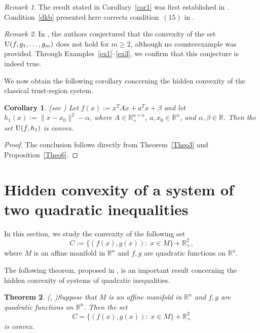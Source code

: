 \documentclass[]{interact}
\theoremstyle{plain}%
\newtheorem{theorem}{Theorem}[section]
\newtheorem{corollary}[theorem]{Corollary}
\theoremstyle{definition}
\theoremstyle{remark}
\newtheorem{remark}{Remark}
\begin{document}
	\begin{remark}
		The result stated in Corollary~\ref{cor1} was first established in
		\cite[Theorem~5.1 and Lemma~5.1]{BomzeJeyakumarLi2018}. Condition~\eqref{dkb} presented here corrects condition~$(15)$ in \cite[Theorem~5.1]{BomzeJeyakumarLi2018}.
	\end{remark}
	
	\begin{remark}
		In \cite[Example~3]{LaraUrruty2022}, the authors conjectured that the convexity of the set ${\rm U}(f,g_1,\ldots,g_m)$ does not hold for $m\geq 2$, although no counterexample was provided. Through Examples~\ref{ex1}--\ref{ex3}, we confirm that this conjecture is indeed true.
	\end{remark}
	
	We now obtain the following corollary concerning the hidden convexity of the classical trust-region system.
	
	\begin{corollary}{\rm (see \cite[Theorem~2.2]{Polyak1998})}
		Let $f(x):=x^TAx+a^Tx+\beta$ and let $h_1(x):=\|x-x_0\|^2-\alpha$, where
		$A\in \mathbb{R}^{n\times n}_{+}$, $a,x_0\in \mathbb{R}^n$, and
		$\alpha,\beta\in \mathbb{R}$. Then the set ${\rm U}(f,h_1)$ is convex.
	\end{corollary}
	
	\begin{proof}
		The conclusion follows directly from Theorem~\ref{Theo3} and Proposition~\ref{Theo6}.
	\end{proof}
	
	
	\section{Hidden convexity of a system of two quadratic inequalities}
	In this section, we study the convexity of the following set
	$$
	C:= \{(f(x), g(x)):\; x\in M\}+\mathbb{R}^{2}_+,
	$$
	where $M$ is an affine manifold in $\mathbb{R}^n$ and $f,g$ are quadratic functions on $\mathbb{R}^n$.
	
	The following theorem, proposed in \cite[Corollary~10]{TuyTuan2013}, is an important result concerning the hidden convexity of systems of quadratic inequalities.
	
	\begin{theorem}{\rm(\cite[Corollary~10]{TuyTuan2013}, \cite[Corollary~10.10]{Tuy2016})}\label{Theo3m} 
		Suppose that $M$ is an affine manifold in $\mathbb{R}^n$ and $f,g$ are quadratic functions on $\mathbb{R}^n$.	 
		Then the set
		$$
		C= \{(f(x), g(x)):\; x\in M\}+\mathbb{R}^{2}_+
		$$
		is convex.                    
	\end{theorem}
	
\end{document}
